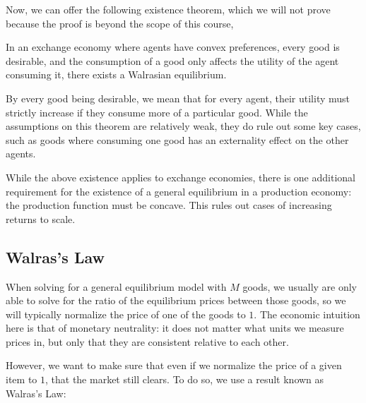 Now, we can offer the following existence theorem, which we will not prove because the proof is beyond the scope of this course,
\begin{theorem*}
    In an exchange economy where agents have convex preferences, every good is desirable, and the consumption of a good only affects the utility of the agent consuming it, there exists a Walrasian equilibrium. 
\end{theorem*}
By every good being desirable, we mean that for every agent, their utility must strictly increase if they consume more of a particular good. While the assumptions on this theorem are relatively weak, they do rule out some key cases, such as goods where consuming one good has an externality effect on the other agents.

While the above existence applies to exchange economies, there is one additional requirement for the existence of a general equilibrium in a production economy: the production function must be concave. This rules out cases of increasing returns to scale. 

\subsection*{Walras's Law}
When solving for a general equilibrium model with $M$ goods, we usually are only able to solve for the ratio of the equilibrium prices between those goods, so we will typically normalize the price of one of the goods to $1$. The economic intuition here is that of monetary neutrality: it does not matter what units we measure prices in, but only that they are consistent relative to each other. 

However, we want to make sure that even if we normalize the price of a given item to $1$, that the market still clears. To do so, we use a result known as Walras's Law:

